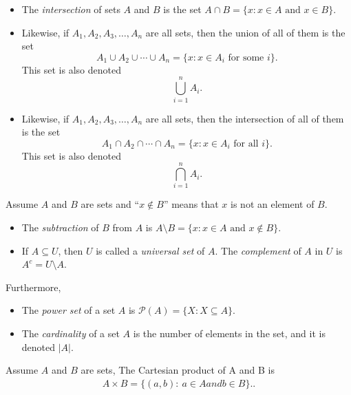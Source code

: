 \documentclass{report}
\begin{document}
\begin{itemize}
\begin{itemize}
                \item The \textit{intersection} of sets $A$ and $B$ is the set $A \cap B = \{x : x \in A \text{ and } x \in B\}$.
                \item Likewise, if $A_1, A_2, A_3, \dots, A_n$ are all sets, then the union of all of them is the set
                    \[
                        A_1 \cup A_2 \cup \cdots \cup A_n = \{x : x \in A_i \text{ for some } i\}.
                    \]
                    This set is also denoted
                    \[
                        \bigcup_{i=1}^n A_i.
                    \]
                \item Likewise, if $A_1, A_2, A_3, \dots, A_n$ are all sets, then the intersection of all of them is the set
                    \[
                        A_1 \cap A_2 \cap \cdots \cap A_n = \{x : x \in A_i \text{ for all } i\}.
                    \]
                    This set is also denoted
                    \[
                        \bigcap_{i=1}^n A_i.
                    \]
            \end{itemize}
            \bigbreak \noindent 
            Assume $A$ and $B$ are sets and ``$x \notin B$'' means that $x$ is not an element of $B$.
            \begin{itemize}
                \item The \textit{subtraction} of $B$ from $A$ is $A \setminus B = \{x : x \in A \text{ and } x \notin B\}$.
                \item If $A \subseteq U$, then $U$ is called a \textit{universal set} of $A$. The \textit{complement} of $A$ in $U$ is $A^c = U \setminus A$.
            \end{itemize}
            \bigbreak \noindent 
            Furthermore, 
            \begin{itemize}
                \item The \textit{power set} of a set $A$ is $\mathcal{P}(A) = \{X : X \subseteq A\}$.
                \item The \textit{cardinality} of a set $A$ is the number of elements in the set, and it is denoted $|A|$.
            \end{itemize}
            \bigbreak \noindent 
            Assume $A$ and $B$ are sets, The Cartesian product of A and B is 
            \begin{align*}
                A \times B = \{(a, b):\  a \in A and b \in B\}.
            .\end{align*}
            \pagebreak \bigbreak \noindent 

\end{itemize}
\end{document}
